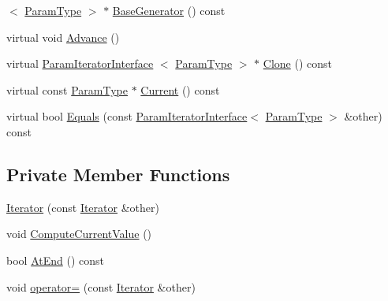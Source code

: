 \begin{DoxyCompactItemize}
$<$ \hyperlink{classtesting_1_1internal_1_1CartesianProductGenerator7_a18469e04d44a379d754ff5044f09531f}{\-Param\-Type} $>$ $\ast$ \hyperlink{classtesting_1_1internal_1_1CartesianProductGenerator7_1_1Iterator_a297272d14c33d1d5423da2a4776f895b}{\-Base\-Generator} () const 
\item 
virtual void \hyperlink{classtesting_1_1internal_1_1CartesianProductGenerator7_1_1Iterator_aaa5a890708f89affa1a7726cf152c872}{\-Advance} ()
\item 
virtual \hyperlink{classtesting_1_1internal_1_1ParamIteratorInterface}{\-Param\-Iterator\-Interface}\*
$<$ \hyperlink{classtesting_1_1internal_1_1CartesianProductGenerator7_a18469e04d44a379d754ff5044f09531f}{\-Param\-Type} $>$ $\ast$ \hyperlink{classtesting_1_1internal_1_1CartesianProductGenerator7_1_1Iterator_a4bee4982ee1152c6935ffd0c2d749421}{\-Clone} () const 
\item 
virtual const \hyperlink{classtesting_1_1internal_1_1CartesianProductGenerator7_a18469e04d44a379d754ff5044f09531f}{\-Param\-Type} $\ast$ \hyperlink{classtesting_1_1internal_1_1CartesianProductGenerator7_1_1Iterator_ab27aeab5db14a30f077a37989ce9261c}{\-Current} () const 
\item 
virtual bool \hyperlink{classtesting_1_1internal_1_1CartesianProductGenerator7_1_1Iterator_a8f18f9a017a12730cce28c07460bbc14}{\-Equals} (const \hyperlink{classtesting_1_1internal_1_1ParamIteratorInterface}{\-Param\-Iterator\-Interface}$<$ \hyperlink{classtesting_1_1internal_1_1CartesianProductGenerator7_a18469e04d44a379d754ff5044f09531f}{\-Param\-Type} $>$ \&other) const 
\end{DoxyCompactItemize}
\subsection*{\-Private \-Member \-Functions}
\begin{DoxyCompactItemize}
\item 
\hyperlink{classtesting_1_1internal_1_1CartesianProductGenerator7_1_1Iterator_a2b76c2e597bc9393f2b99e869e4fa8d2}{\-Iterator} (const \hyperlink{classtesting_1_1internal_1_1CartesianProductGenerator7_1_1Iterator}{\-Iterator} \&other)
\item 
void \hyperlink{classtesting_1_1internal_1_1CartesianProductGenerator7_1_1Iterator_a4c18cbbef042bab72ed484f5b6923908}{\-Compute\-Current\-Value} ()
\item 
bool \hyperlink{classtesting_1_1internal_1_1CartesianProductGenerator7_1_1Iterator_a6eb9b47ffa4b10f0dca403fc597faba0}{\-At\-End} () const 
\item 
void \hyperlink{classtesting_1_1internal_1_1CartesianProductGenerator7_1_1Iterator_ac087d740f6aa05ec07afd0c5c0327105}{operator=} (const \hyperlink{classtesting_1_1internal_1_1CartesianProductGenerator7_1_1Iterator}{\-Iterator} \&other)
\end{DoxyCompactItemize}
